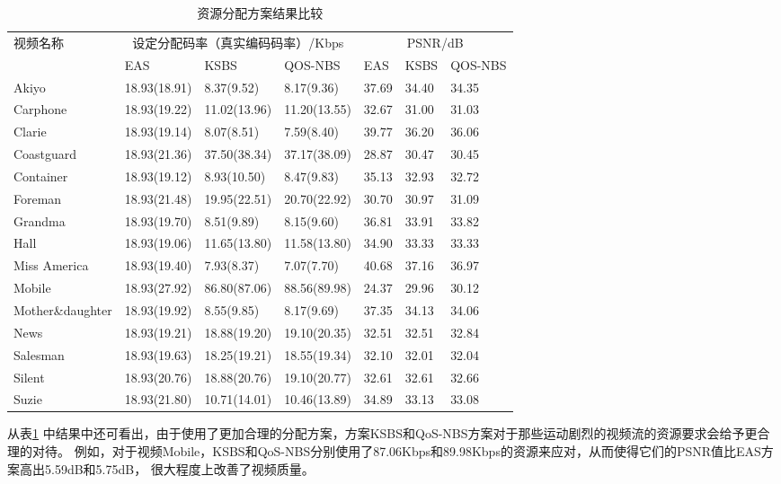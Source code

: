 \begin{table}[tb]
    \wuhao
    \centering
    \caption{资源分配方案结果比较}
    \begin{tabular*}{\textwidth}{p{3cm}llp{2.5cm}lll}
    \toprule
    视频名称 & \multicolumn{3}{c}{设定分配码率（真实编码码率）/Kbps} &  \multicolumn{3}{c}{PSNR/dB} \\
    \cmidrule{2-7}
             &  EAS & KSBS & QOS-NBS&  EAS & KSBS & QOS-NBS \\
    \midrule
Akiyo                & 18.93(18.91)& 8.37(9.52)&8.17(9.36)  &37.69  &34.40  &34.35 \\ 
Carphone             & 18.93(19.22)& 11.02(13.96)&11.20(13.55)  &32.67  &31.00  &31.03 \\ 
Clarie               & 18.93(19.14)& 8.07(8.51)&7.59(8.40)  &39.77  &36.20  &36.06 \\ 
Coastguard           & 18.93(21.36)& 37.50(38.34)&37.17(38.09)  &28.87  &30.47  &30.45 \\ 
Container            & 18.93(19.12)& 8.93(10.50)&8.47(9.83)  &35.13  &32.93  &32.72 \\ 
Foreman              & 18.93(21.48)& 19.95(22.51)&20.70(22.92)  &30.70  &30.97  &31.09 \\ 
Grandma              & 18.93(19.70)& 8.51(9.89)&8.15(9.60)  &36.81  &33.91  &33.82 \\ 
Hall                 & 18.93(19.06)& 11.65(13.80)&11.58(13.80)  &34.90  &33.33  &33.33 \\ 
Miss America         & 18.93(19.40)& 7.93(8.37)&7.07(7.70)  &40.68  &37.16  &36.97 \\ 
Mobile               & 18.93(27.92)& 86.80(87.06)&88.56(89.98)  &24.37  &29.96  &30.12 \\ 
Mother\&daughter     & 18.93(19.92)& 8.55(9.85)&8.17(9.69)  &37.35  &34.13  &34.06 \\ 
News                 & 18.93(19.21)& 18.88(19.20)&19.10(20.35)  &32.51  &32.51  &32.84 \\ 
Salesman             & 18.93(19.63)& 18.25(19.21)&18.55(19.34)  &32.10  &32.01  &32.04 \\ 
Silent               & 18.93(20.76)& 18.88(20.76)&19.10(20.77)  &32.61  &32.61  &32.66 \\ 
Suzie                & 18.93(21.80)& 10.71(14.01)&10.46(13.89)  &34.89  &33.13  &33.08 \\ 
\bottomrule
    \end{tabular*}
    \label{tab:chap_nash:resource_allocation_comparision}
\end{table}
从表\ref{tab:chap_nash:resource_allocation_comparision} 中结果中还可看出，由于使用了更加合理的分配方案，方案KSBS和QoS-NBS方案对于那些运动剧烈的视频流的资源要求会给予更合理的对待。
例如，对于视频Mobile，KSBS和QoS-NBS分别使用了87.06Kbps和89.98Kbps的资源来应对，从而使得它们的PSNR值比EAS方案高出5.59dB和5.75dB，
很大程度上改善了视频质量。

